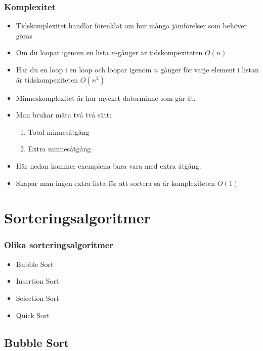 \documentclass[aspectratio=169]{beamer}
\begin{document}
\begin{frame}
	\frametitle{Komplexitet}
	
	\begin{itemize}
		\item Tidskomplexitet handlar förenklat om hur många jämförelser som behöver göras
		\item Om du loopar igenom en lista \(n\)-gånger är tidskompexiteten \(O(n)\)
		\item Har du en loop i en loop och loopar igenom \(n\) gånger för varje element i listan är tidskompexiteten \(O(n^2)\)
		\item Minneskomplexitet är hur mycket datorminne som går åt.
		\item Man brukar mäta två två sätt:
		\begin{enumerate}
			\item Total minnesåtgång
			\item Extra minnesåtgång
		\end{enumerate}
		\item Här nedan kommer exemplena bara vara med extra åtgång.
		\item Skapar man ingen extra lista för att sortera så är komplexiteten \(O(1)\)
	\end{itemize}
	
\end{frame}

\section{Sorteringsalgoritmer}

\begin{frame}
	\frametitle{Olika sorteringsalgoritmer}
	
	\begin{itemize}
		\item Bubble Sort
		\item Insertion Sort
		\item Selection Sort
		\item Quick Sort
	\end{itemize}
	
\end{frame}

\subsection{Bubble Sort}
\end{document}
